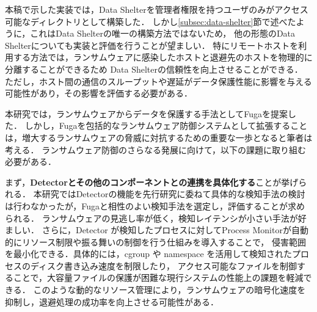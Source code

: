 本稿で示した実装では，Data Shelterを管理者権限を持つユーザのみがアクセス可能なディレクトリとして構築した．
しかし\ref{subsec:data-shelter}節で述べたように，これはData Shelterの唯一の構築方法ではないため，
他の形態のData Shelterについても実装と評価を行うことが望ましい．
特にリモートホストを利用する方法では，ランサムウェアに感染したホストと退避先のホストを物理的に分離することができるため
Data Shelterの信頼性を向上させることができる．
ただし，ホスト間の通信のスループットや遅延がデータ保護性能に影響を与える可能性があり，その影響を評価する必要がある．

本研究では，ランサムウェアからデータを保護する手法としてFugaを提案した．
しかし，Fugaを包括的なランサムウェア防御システムとして拡張することは，増大するランサムウェアの脅威に対抗するための重要な一歩となると筆者は考える．
ランサムウェア防御のさらなる発展に向けて，以下の課題に取り組む必要がある．

まず，\textbf{Detectorとその他のコンポーネントとの連携を具体化する}ことが挙げられる．
本研究ではDetectorの機能を先行研究に委ねて具体的な検知手法の検討は行わなかったが，Fugaと相性のよい検知手法を選定し，評価することが求められる．
ランサムウェアの見逃し率が低く，検知レイテンシが小さい手法が好ましい．
% 
さらに，Detector が検知したプロセスに対してProcess Monitorが自動的にリソース制限や振る舞いの制御を行う仕組みを導入することで，
侵害範囲を最小化できる．具体的には，cgroup や namespace を活用して検知されたプロセスのディスク書き込み速度を制限したり，
アクセス可能なファイルを制御することで，大容量ファイルの保護が困難な現行システムの性能上の課題を軽減できる．
このような動的なリソース管理により，ランサムウェアの暗号化速度を抑制し，退避処理の成功率を向上させる可能性がある．

